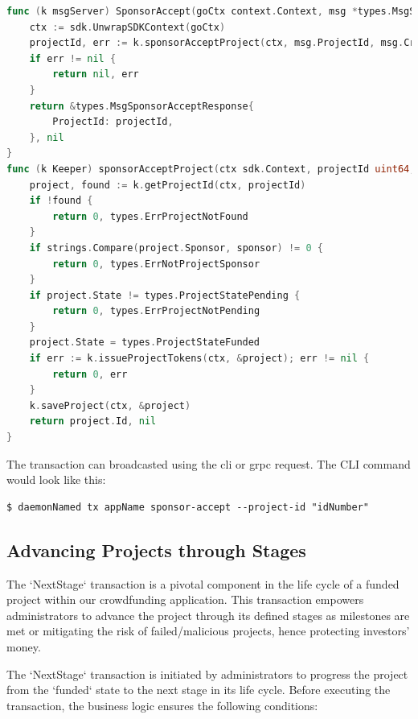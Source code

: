 \newpage
\begin{lstlisting}[language=go, caption=Keeper implementation for SponsorAccept ,label={lst:keeper-accept}]
func (k msgServer) SponsorAccept(goCtx context.Context, msg *types.MsgSponsorAccept) (*types.MsgSponsorAcceptResponse, error) {
	ctx := sdk.UnwrapSDKContext(goCtx)
	projectId, err := k.sponsorAcceptProject(ctx, msg.ProjectId, msg.Creator)
	if err != nil {
		return nil, err
	}
	return &types.MsgSponsorAcceptResponse{
		ProjectId: projectId,
	}, nil
}
func (k Keeper) sponsorAcceptProject(ctx sdk.Context, projectId uint64, sponsor string) (uint64, error) {
	project, found := k.getProjectId(ctx, projectId)
	if !found {
		return 0, types.ErrProjectNotFound
	}
	if strings.Compare(project.Sponsor, sponsor) != 0 {
		return 0, types.ErrNotProjectSponsor
	}
	if project.State != types.ProjectStatePending {
		return 0, types.ErrProjectNotPending
	}
	project.State = types.ProjectStateFunded
	if err := k.issueProjectTokens(ctx, &project); err != nil {
		return 0, err
	}
	k.saveProject(ctx, &project)
	return project.Id, nil
}
\end{lstlisting}

The transaction can broadcasted using the \gls{cli} or \gls{grpc} request. The CLI command would look like this:

\begin{verbatim}
$ daemonNamed tx appName sponsor-accept --project-id "idNumber"
\end{verbatim}

\subsection{Advancing Projects through Stages}

The `NextStage` transaction is a pivotal component in the life cycle of a funded project within our crowdfunding application. This transaction empowers administrators to advance the project through its defined stages as milestones are met or mitigating the risk of failed/malicious projects, hence protecting investors' money.

The `NextStage` transaction is initiated by administrators to progress the project from the `funded` state to the next stage in its life cycle. Before executing the transaction, the business logic ensures the following conditions:

